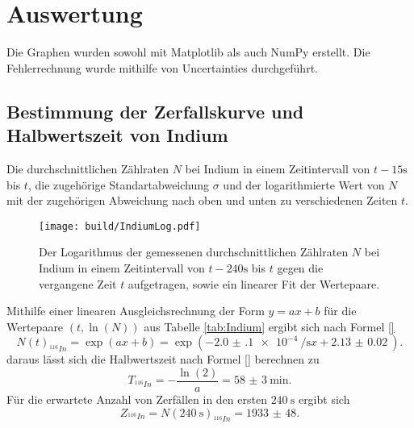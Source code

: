 \section{Auswertung}
\label{sec:Auswertung}


Die Graphen wurden sowohl mit Matplotlib \cite{matplotlib} als auch NumPy \cite{numpy} erstellt. Die
Fehlerrechnung wurde mithilfe von Uncertainties \cite{uncertainties} durchgeführt.


\subsection{Bestimmung der Zerfallskurve und Halbwertszeit von Indium}
 \begin{table}
  \centering
  \caption{Die durchschnittlichen Zählraten $N$ bei Indium in einem Zeitintervall von $t-15\si{\second}$ bis $t$, die zugehörige Standartabweichung $\sigma$ und der logarithmierte Wert von $N$ mit der zugehörigen Abweichung nach oben und unten zu verschiedenen Zeiten $t$.}
  
 \end{table}
\begin{figure}
	\centering
	\caption{Der Logarithmus der gemessenen durchschnittlichen Zählraten $N$ bei Indium in einem Zeitintervall von $t-240\si{\second}$ bis $t$ gegen die vergangene Zeit $t$ aufgetragen, sowie ein linearer Fit der Wertepaare.}
	\texttt{[image: build/IndiumLog.pdf]}
	\label{fig:Indium}
\end{figure}
Mithilfe einer linearen Ausgleichsrechnung der Form $y=a x + b$ für die Wertepaare $(t, \ln(N))$ aus Tabelle \ref{tab:Indium} ergibt sich nach Formel \eqref{}
\begin{equation}
	N(t)_{^{116}In}=\exp\left(a x + b\right)=\exp\left(\SI{-2.0(1)e-4}{\per\second} x + \SI{2.13(2)}{}\right)\text{.}
\end{equation}
daraus lässt sich die Halbwertszeit nach Formel \eqref{} berechnen zu
\begin{equation}
	T_{^{116}In}=-\frac{\ln(2)}{a}=\SI{58(3)}{\minute}\text{.}
\end{equation}
Für die erwartete Anzahl von Zerfällen in den ersten $\SI{240}{\second}$ ergibt sich
\begin{equation}
	Z_{^{116}In} = N(\SI{240}{\second})_{^{116}In}=\num{1933(48)}\text{.}
\end{equation}


